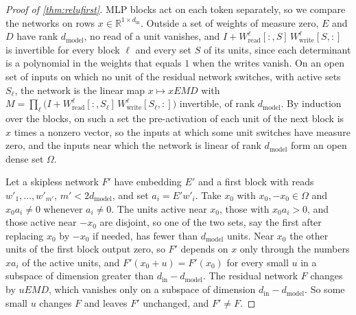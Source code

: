 \documentclass[10pt]{article}
\theoremstyle{definition}
\theoremstyle{remark}
\newcommand{\R}{\mathbb{R}}
\newcommand{\Wread}{W_{\mathrm{read}}}
\newcommand{\Wwrite}{W_{\mathrm{write}}}
\newcommand{\dm}{d_{\mathrm{model}}}
\begin{document}
\begin{proof}[Proof of \cref{thm:relufirst}]
MLP blocks act on each token separately, so we compare the networks on rows $x \in \R^{1\times d_{\mathrm{in}}}$. Outside a set of weights of measure zero, $E$ and $D$ have rank $\dm$, no read of a unit vanishes, and $I + \Wread^{\ell}[{:},S]\,\Wwrite^{\ell}[S,{:}]$ is invertible for every block $\ell$ and every set $S$ of its units, since each determinant is a polynomial in the weights that equals $1$ when the writes vanish. On an open set of inputs on which no unit of the residual network switches, with active sets $S_\ell$, the network is the linear map $x \mapsto xEMD$ with $M = \prod_\ell\big(I + \Wread^{\ell}[{:},S_\ell]\,\Wwrite^{\ell}[S_\ell,{:}]\big)$ invertible, of rank $\dm$. By induction over the blocks, on such a set the pre-activation of each unit of the next block is $x$ times a nonzero vector, so the inputs at which some unit switches have measure zero, and the inputs near which the network is linear of rank $\dm$ form an open dense set $\Omega$.

Let a skipless network $F'$ have embedding $E'$ and a first block with reads $w'_1, \dots, w'_{m'}$, $m' < 2\dm$, and set $a_i = E'w'_i$. Take $x_0$ with $x_0, -x_0 \in \Omega$ and $x_0a_i \neq 0$ whenever $a_i \neq 0$. The units active near $x_0$, those with $x_0a_i > 0$, and those active near $-x_0$ are disjoint, so one of the two sets, say the first after replacing $x_0$ by $-x_0$ if needed, has fewer than $\dm$ units. Near $x_0$ the other units of the first block output zero, so $F'$ depends on $x$ only through the numbers $xa_i$ of the active units, and $F'(x_0 + u) = F'(x_0)$ for every small $u$ in a subspace of dimension greater than $d_{\mathrm{in}} - \dm$. The residual network $F$ changes by $uEMD$, which vanishes only on a subspace of dimension $d_{\mathrm{in}} - \dm$. So some small $u$ changes $F$ and leaves $F'$ unchanged, and $F' \neq F$.
\end{proof}
\end{document}

